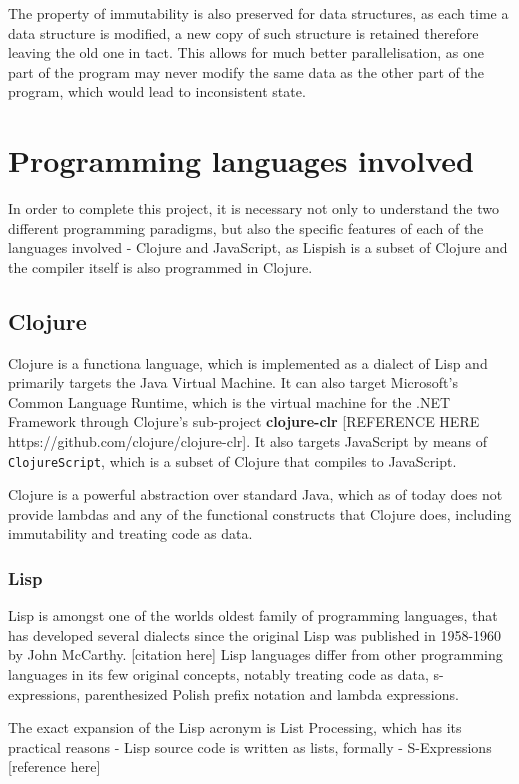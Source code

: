 The property of immutability is also preserved for data structures, as each time a data structure is modified, a new copy of such structure is retained therefore leaving the old one in tact. This allows for much better parallelisation, as one part of the program may never modify the same data as the other part of the program, which would lead to inconsistent state.

\section{Programming languages involved}
In order to complete this project, it is necessary not only to understand the two different programming paradigms, but also the specific features of each of the languages involved - Clojure and JavaScript, as Lispish is a subset of Clojure and the compiler itself is also programmed in Clojure.

\subsection{Clojure}
Clojure\cite{Clojure:2013:Site} is a functiona language, which is implemented as a dialect of Lisp and primarily targets the Java Virtual Machine. It can also target Microsoft's Common Language Runtime, which is the virtual machine for the .NET Framework through Clojure's sub-project \textbf{clojure-clr} [REFERENCE HERE https://github.com/clojure/clojure-clr]. 
It also targets JavaScript by means of \texttt{ClojureScript}\cite{ClojureScript:2013:Site}, which is a subset of Clojure that compiles to JavaScript. 

Clojure is a powerful abstraction over standard Java, which as of today does not provide lambdas and any of the functional constructs that Clojure does, including immutability and treating code as data.

\subsubsection{Lisp}

Lisp is amongst one of the worlds oldest family of programming languages, that has developed several dialects since the original Lisp was published in 1958-1960 by John McCarthy. [citation here]
Lisp languages differ from other programming languages in its few original concepts, notably treating code as data, s-expressions, parenthesized Polish prefix notation and lambda expressions.

The exact expansion of the Lisp acronym is List Processing, which has its practical reasons - Lisp source code is written as lists, formally - S-Expressions [reference here]

